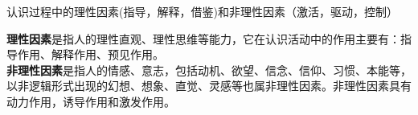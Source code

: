 \textbf{{}}

认识过程中的理性因素(指导，解释，借鉴)和非理性因素（激活，驱动，控制）

\textbf{{理性因素}}是指人的理性直观、理性思维等能力，它在认识活动中的作用主要有：指导作用、解释作用、预见作用。\\[2\baselineskip]{\textbf{非理性因素}}是指人的情感、意志，包括动机、欲望、信念、信仰、习惯、本能等，以非逻辑形式出现的幻想、想象、直觉、灵感等也属非理性因素。非理性因素具有动力作用，诱导作用和激发作用。\\
